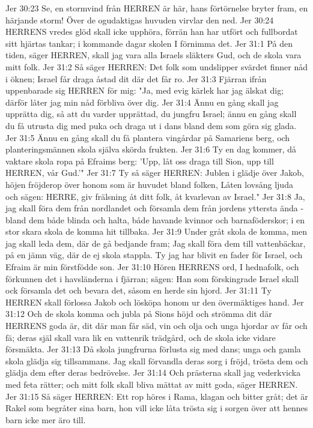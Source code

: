 Jer 30:23  Se, en stormvind från HERREN är här, hans förtörnelse bryter fram, en härjande storm! Över de ogudaktigas huvuden virvlar den ned.
Jer 30:24  HERRENS vredes glöd skall icke upphöra, förrän han har utfört och fullbordat sitt hjärtas tankar; i kommande dagar skolen I förnimma det.
Jer 31:1  På den tiden, säger HERREN, skall jag vara alla Israels släkters Gud, och de skola vara mitt folk.
Jer 31:2  Så säger HERREN: Det folk som undslipper svärdet finner nåd i öknen; Israel får draga åstad dit där det får ro.
Jer 31:3  Fjärran ifrån uppenbarade sig HERREN för mig: "Ja, med evig kärlek har jag älskat dig; därför låter jag min nåd förbliva över dig.
Jer 31:4  Ännu en gång skall jag upprätta dig, så att du varder upprättad, du jungfru Israel; ännu en gång skall du få utrusta dig med puka och draga ut i dans bland dem som göra sig glada.
Jer 31:5  Ännu en gång skall du få plantera vingårdar på Samariens berg, och planteringsmännen skola själva skörda frukten.
Jer 31:6  Ty en dag kommer, då vaktare skola ropa på Efraims berg: 'Upp, låt oss draga till Sion, upp till HERREN, vår Gud.'"
Jer 31:7  Ty så säger HERREN: Jublen i glädje över Jakob, höjen fröjderop över honom som är huvudet bland folken, Låten lovsång ljuda och sägen: HERRE, giv frälsning åt ditt folk, åt kvarlevan av Israel."
Jer 31:8  Ja, jag skall föra dem från nordlandet och församla dem från jordens yttersta ända - bland dem både blinda och halta, både havande kvinnor och barnaföderskor; i en stor skara skola de komma hit tillbaka.
Jer 31:9  Under gråt skola de komma, men jag skall leda dem, där de gå bedjande fram; Jag skall föra dem till vattenbäckar, på en jämn väg, där de ej skola stappla. Ty jag har blivit en fader för Israel, och Efraim är min förstfödde son.
Jer 31:10  Hören HERRENS ord, I hednafolk, och förkunnen det i havsländerna i fjärran; sägen: Han som förskingrade Israel skall ock församla det och bevara det, såsom en herde sin hjord.
Jer 31:11  Ty HERREN skall förlossa Jakob och lösköpa honom ur den övermäktiges hand.
Jer 31:12  Och de skola komma och jubla på Sions höjd och strömma dit där HERRENS goda är, dit där man får säd, vin och olja och unga hjordar av får och fä; deras själ skall vara lik en vattenrik trädgård, och de skola icke vidare försmäkta.
Jer 31:13  Då skola jungfrurna förlusta sig med dans; unga och gamla skola glädja sig tillsammans. Jag skall förvandla deras sorg i fröjd, trösta dem och glädja dem efter deras bedrövelse.
Jer 31:14  Och prästerna skall jag vederkvicka med feta rätter; och mitt folk skall bliva mättat av mitt goda, säger HERREN.
Jer 31:15  Så säger HERREN: Ett rop höres i Rama, klagan och bitter gråt; det är Rakel som begråter sina barn, hon vill icke låta trösta sig i sorgen över att hennes barn icke mer äro till.
